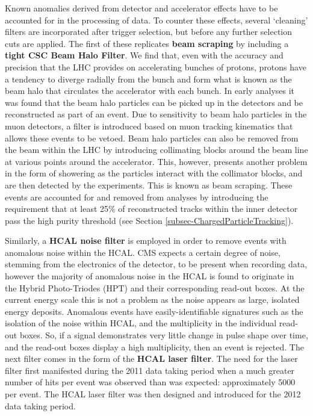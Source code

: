 Known anomalies derived from detector and accelerator effects have to be accounted for in the processing of data. To counter these effects, several `cleaning' filters are incorporated after trigger selection, but before any further selection cuts are applied. The first of these replicates \textbf{beam scraping} by including a \textbf{tight CSC Beam Halo Filter}. We find that, even with the accuracy and precision that the LHC provides on accelerating bunches of protons, protons have a tendency to diverge radially from the bunch and form what is known as the beam halo that circulates the accelerator with each bunch. In early analyses it was found that the beam halo particles can be picked up in the detectors and be reconstructed as part of an event. Due to sensitivity to beam halo particles in the muon detectors, a filter is introduced based on muon tracking kinematics that allows these events to be vetoed. Beam halo particles can also be removed from the beam within the LHC by introducing collimating blocks around the beam line at various points around the accelerator. This, however, presents another problem in the form of showering as the particles interact with the collimator blocks, and are then detected by the experiments. This is known as beam scraping. These events are accounted for and removed from analyses by introducing the requirement that at least 25\% of reconstructed tracks within the inner detector pass the high purity threshold (see Section \ref{subsec-ChargedParticleTracking}). 

Similarly, a \textbf{HCAL noise filter} is employed in order to remove events with anomalous noise within the HCAL. CMS expects a certain degree of noise, stemming from the electronics of the detector, to be present when recording data, however the majority of anomalous noise in the HCAL is found to originate in the Hybrid Photo-Triodes (HPT) and their corresponding read-out boxes. At the current energy scale this is not a problem as the noise appears as large, isolated energy deposits. Anomalous events have easily-identifiable signatures such as the isolation of the noise within HCAL, and the multiplicity in the individual read-out boxes. So, if a signal demonstrates very little change in pulse shape over time, and the read-out boxes display a high multiplicity, then an event is rejected. The next filter comes in the form of the \textbf{HCAL laser filter}. The need for the laser filter first manifested during the 2011 data taking period when a much greater number of hits per event was observed than was expected: approximately 5000 per event. The HCAL laser filter was then designed and introduced for the 2012 data taking period.  

